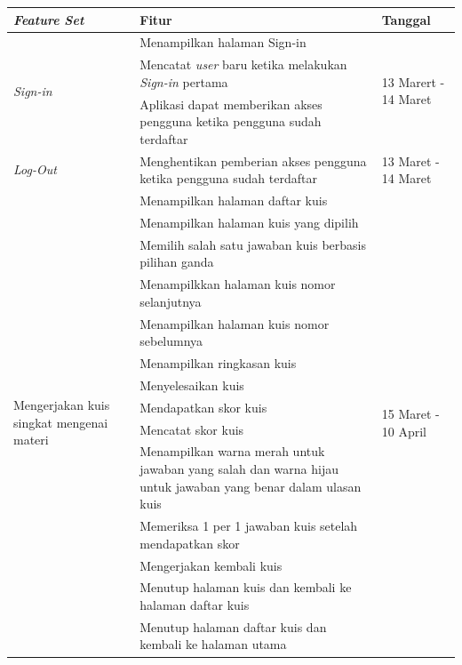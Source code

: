 \begin{table}[H]
	\begin{tabular}{|p{3cm}|p{}|p{2cm}|}
		\hline
		\centering\textbf{\textit{Feature Set}} & \centering\textbf{Fitur} & \multicolumn{1}{m{2cm}|}{\centering \textbf{Tanggal}} \\
		\hline
		\multirow{3}{2.5cm}{\textit{Sign-in}} &Menampilkan halaman Sign-in & \multirow{3}{2cm}{13 Marert - 14 Maret} \\
		\cline{2-2}
		 &Mencatat \textit{user} baru ketika melakukan \textit{Sign-in} pertama & \\
		\cline{2-2}
		 &Aplikasi dapat memberikan akses pengguna ketika pengguna sudah terdaftar&  \\
		\hline
		\multirow{1}{2.5cm}{\textit{Log-Out}} &Menghentikan pemberian akses pengguna ketika pengguna sudah terdaftar& 13 Maret - 14 Maret \\
		\hline
		\multirow{14}{2.5cm}{Mengerjakan kuis singkat mengenai materi} &Menampilkan halaman daftar kuis& \multirow{14}{2cm}{15 Maret - 10 April}\\
		\cline{2-2}
		&Menampilkan halaman kuis yang dipilih& \\
		\cline{2-2}
		&Memilih salah satu jawaban kuis berbasis pilihan ganda&  \\
		\cline{2-2}
		&Menampilkkan halaman kuis nomor selanjutnya&  \\
		\cline{2-2}
		&Menampilkan halaman kuis nomor sebelumnya& \\
		\cline{2-2}
		&Menampilkan ringkasan kuis& \\
		\cline{2-2}
		&Menyelesaikan kuis&\\
		\cline{2-2}
		&Mendapatkan skor kuis&  \\
		\cline{2-2}
		&Mencatat skor kuis&  \\
		\cline{2-2}
		&Menampilkan warna merah untuk jawaban yang salah dan warna hijau untuk jawaban yang benar dalam ulasan kuis& \\
		\cline{2-2}
		&Memeriksa 1 per 1 jawaban kuis setelah mendapatkan skor&  \\
		\cline{2-2}
		&Mengerjakan kembali kuis& \\
		\cline{2-2}
		&Menutup halaman kuis dan kembali ke halaman daftar kuis&  \\
		\cline{2-2}
		&Menutup halaman daftar kuis dan kembali ke halaman utama& \\
		\hline
		
	\end{tabular}
\end{table}
